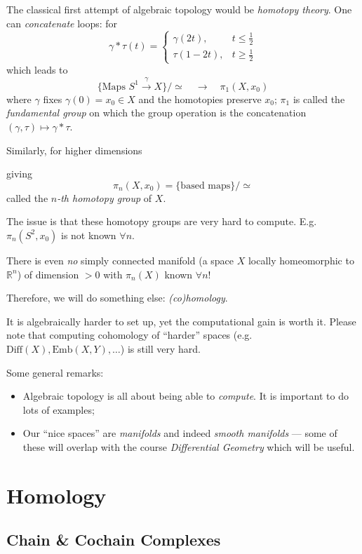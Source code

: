 \documentclass[a4paper,11pt]{article}
\begin{document}
	The classical first attempt of algebraic topology would be \emph{homotopy theory}. One can \emph{concatenate} loops:
	for
	\[
		\gamma * \tau (t) = \begin{cases}
			\gamma(2t),& t \leq \frac{1}{2}\\
			\tau(1 - 2t),& t \geq \frac{1}{2}
		\end{cases}
	\]
	which leads to
	\[
		\{\text{Maps }S^1 \xrightarrow{\gamma} X\} / \simeq \quad  \longrightarrow \quad \pi_1(X,x_0)
	\]
	where $\gamma$ fixes $\gamma(0) = x_0 \in X$ and the homotopies preserve $x_0$; 
	$\pi_1$ is called the \emph{fundamental group} on which the group operation is the concatenation $(\gamma, \tau) \mapsto \gamma * \tau$. 
	
	Similarly, for higher dimensions 

	giving
	\[
		\pi_n (X, x_0) = \{\text{based maps}\} / \simeq
	\]
	called the \emph{$n$-th homotopy group} of $X$.

	The issue is that these homotopy groups are very hard to compute. E.g.\ $\pi_n (S^2, x_0)$ is not known $\forall n$.
	
	There is even \emph{no} simply connected manifold (a space $X$ locally homeomorphic to $\mathbb{R}^n$) of dimension $> 0$ with $\pi_n (X)$ known $\forall n$!
	
	Therefore, we will do something else: \emph{(co)homology}.

	It is algebraically harder to set up, yet the computational gain is worth it. Please note that computing cohomology of ``harder'' spaces (e.g.\ $\text{Diff}(X), \text{Emb}(X,Y), \dots$) is still very hard.

	Some general remarks:
	\begin{itemize}
		\item Algebraic topology is all about being able to \emph{compute}. It is important to do lots of examples;
		\item Our ``nice spaces'' are \emph{manifolds} and indeed \emph{smooth manifolds} --- some of these will overlap with the course \emph{Differential Geometry} which will be useful. 
	\end{itemize}

	\newpage
	\section{Homology}
	\subsection{Chain \& Cochain Complexes} 
\end{document}
